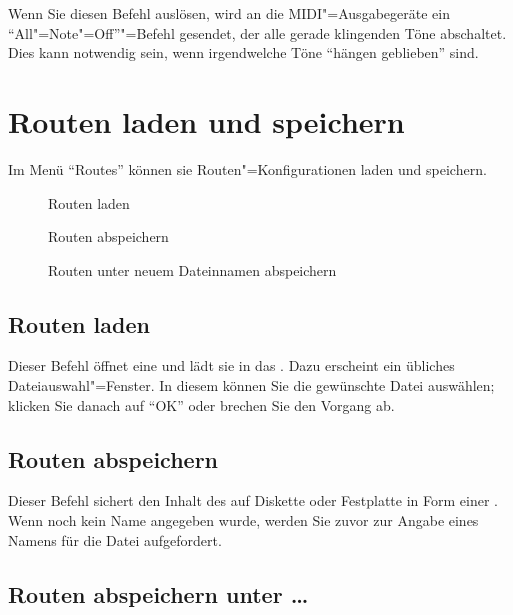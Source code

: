 Wenn Sie diesen Befehl auslösen, wird an die MIDI"=Ausgabegeräte 
ein ``All"=Note"=Off''"=Befehl gesendet, der alle gerade klingenden 
Töne abschaltet. Dies kann notwendig sein, wenn irgendwelche 
Töne ``hängen geblieben'' sind.



\section{Routen laden und speichern}\label{sec:MS_ROUTES}
Im Menü "`Routes"' können sie Routen"=Konfigurationen laden 
und speichern.

\begin{description}
\item[] Routen laden
\item[] Routen abspeichern
\item[] Routen unter neuem
  Dateinnamen abspeichern
\end{description}

\subsection{Routen laden}\label{sec:MI_ROUTELOAD}


Dieser Befehl öffnet eine  
und lädt sie in das . Dazu erscheint 
ein übliches Dateiauswahl"=Fenster. In diesem können Sie die 
gewünschte Datei auswählen; klicken Sie danach auf "`OK"' oder 
brechen Sie den Vorgang ab.


\subsection{Routen abspeichern}\label{sec:MI_ROUTESAVE}



Dieser Befehl sichert den Inhalt des  
auf Diskette oder Festplatte in Form einer . 
Wenn noch kein Name angegeben wurde, werden Sie zuvor zur Angabe 
eines Namens für die Datei aufgefordert.


\subsection{Routen abspeichern unter \dots}\label{sec:MI_ROUTESAVEAS}




